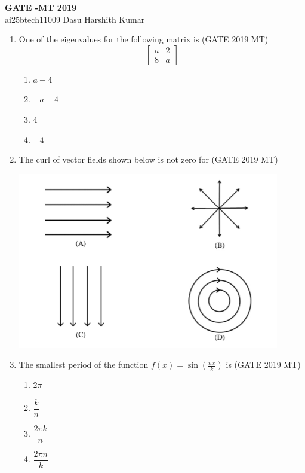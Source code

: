 \documentclass[12pt]{article}
\newcommand{\myvec}[1]{\begin{bmatrix}#1\end{bmatrix}}
\begin{document}
\begin{center}
    {\LARGE \bf GATE -MT 2019}\\[1em]
    ai25btech11009 \quad Dasu Harshith Kumar
\end{center}

\begin{enumerate}

\item One of the eigenvalues for the following matrix is \hspace{1em} (GATE 2019 MT)
\[
\myvec{a & 2 \\
       8 & a}
\]
\begin{enumerate}[label=(\alph*)]
    \item $a-4$
    \item $-a-4$
    \item $4$
    \item $-4$
\end{enumerate}

\item The curl of vector fields shown below is not zero for \hspace{1em} (GATE 2019 MT)
\begin{center}
    \includegraphics[width=0.9\textwidth]{images/qq2oi.jpg}
\end{center}

\item The smallest period of the function $f(x) = \sin\left(\frac{n x}{k}\right)$ is \hspace{1em} (GATE 2019 MT)
\begin{enumerate}[label=(\alph*)]
    \item $2\pi$
    \item $\dfrac{k}{n}$
    \item $\dfrac{2\pi k}{n}$
    \item $\dfrac{2\pi n}{k}$
\end{enumerate}


\end{enumerate}
\end{document}
